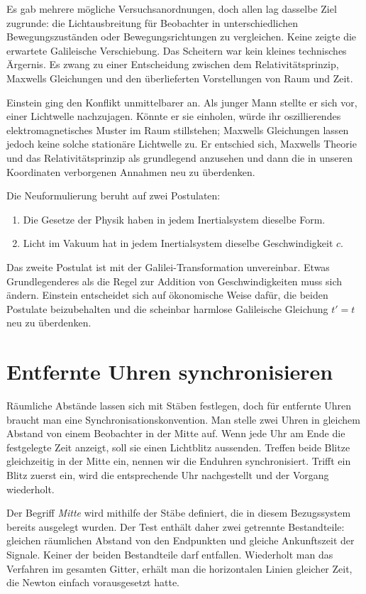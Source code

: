 Es gab mehrere mögliche Versuchsanordnungen, doch allen lag dasselbe Ziel zugrunde: die Lichtausbreitung für Beobachter in unterschiedlichen Bewegungszuständen oder Bewegungsrichtungen zu vergleichen. Keine zeigte die erwartete Galileische Verschiebung. Das Scheitern war kein kleines technisches Ärgernis. Es zwang zu einer Entscheidung zwischen dem Relativitätsprinzip, Maxwells Gleichungen und den überlieferten Vorstellungen von Raum und Zeit.

Einstein ging den Konflikt unmittelbarer an. Als junger Mann stellte er sich vor, einer Lichtwelle nachzujagen. Könnte er sie einholen, würde ihr oszillierendes elektromagnetisches Muster im Raum stillstehen; Maxwells Gleichungen lassen jedoch keine solche stationäre Lichtwelle zu. Er entschied sich, Maxwells Theorie und das Relativitätsprinzip als grundlegend anzusehen und dann die in unseren Koordinaten verborgenen Annahmen neu zu überdenken.

Die Neuformulierung beruht auf zwei Postulaten:
\begin{enumerate}
\item Die Gesetze der Physik haben in jedem Inertialsystem dieselbe Form.
\item Licht im Vakuum hat in jedem Inertialsystem dieselbe Geschwindigkeit \(c\).
\end{enumerate}

Das zweite Postulat ist mit der Galilei-Transformation unvereinbar. Etwas Grundlegenderes als die Regel zur Addition von Geschwindigkeiten muss sich ändern. Einstein entscheidet sich auf ökonomische Weise dafür, die beiden Postulate beizubehalten und die scheinbar harmlose Galileische Gleichung \(t'=t\) neu zu überdenken.

\section{Entfernte Uhren synchronisieren}

Räumliche Abstände lassen sich mit Stäben festlegen, doch für entfernte Uhren braucht man eine Synchronisationskonvention. Man stelle zwei Uhren in gleichem Abstand von einem Beobachter in der Mitte auf. Wenn jede Uhr am Ende die festgelegte Zeit anzeigt, soll sie einen Lichtblitz aussenden. Treffen beide Blitze gleichzeitig in der Mitte ein, nennen wir die Enduhren synchronisiert. Trifft ein Blitz zuerst ein, wird die entsprechende Uhr nachgestellt und der Vorgang wiederholt.

Der Begriff \emph{Mitte} wird mithilfe der Stäbe definiert, die in diesem Bezugssystem bereits ausgelegt wurden. Der Test enthält daher zwei getrennte Bestandteile: gleichen räumlichen Abstand von den Endpunkten und gleiche Ankunftszeit der Signale. Keiner der beiden Bestandteile darf entfallen. Wiederholt man das Verfahren im gesamten Gitter, erhält man die horizontalen Linien gleicher Zeit, die Newton einfach vorausgesetzt hatte.

